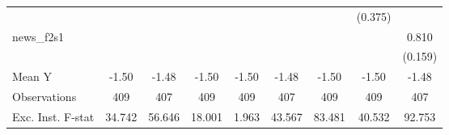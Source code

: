 {\begin{tabular}{l*{8}{c}}
            &                     &                     &                     &                     &                     &                     &     (0.375)         &                     \\
\addlinespace
news\_f2s1   &                     &                     &                     &                     &                     &                     &                     &       0.810\sym{***}\\
            &                     &                     &                     &                     &                     &                     &                     &     (0.159)         \\
\midrule
Mean Y      &       -1.50         &       -1.48         &       -1.50         &       -1.50         &       -1.48         &       -1.50         &       -1.50         &       -1.48         \\
Observations&         409         &         407         &         409         &         409         &         407         &         409         &         409         &         407         \\
Exc. Inst. F-stat&      34.742         &      56.646         &      18.001         &       1.963         &      43.567         &      83.481         &      40.532         &      92.753         \\
\bottomrule
\end{tabular}
}
